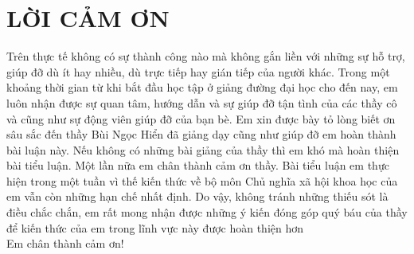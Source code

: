 \section*{LỜI CẢM ƠN}
\thispagestyle{empty}
Trên thực tế không có sự thành công nào mà không gắn liền với những sự hỗ trợ, giúp đỡ dù ít hay nhiều, dù trực tiếp hay gián tiếp của người khác. Trong một khoảng thời gian từ khi bắt đầu học tập ở giảng đường đại học cho đến nay, em luôn nhận được sự quan tâm, hướng dẫn và sự giúp đỡ tận tình của các thầy cô và cũng như sự động viên giúp đỡ của bạn bè. Em xin được bày tỏ lòng biết ơn sâu sắc đến thầy Bùi Ngọc Hiển đã giảng dạy cũng như giúp đỡ em hoàn thành bài luận này. Nếu không có những bài giảng của thầy thì em khó mà hoàn thiện bài tiểu luận. Một lần nữa em chân thành cảm ơn thầy. Bài tiểu luận em thực hiện trong một tuần vì thế kiến thức về bộ môn Chủ nghĩa xã hội khoa học của em vẫn còn những hạn chế nhất định. Do vậy, không tránh những thiếu sót là điều chắc chắn, em rất mong nhận được những ý kiến đóng góp quý báu của thầy để kiến thức của em trong lĩnh vực này được hoàn thiện hơn\\
Em chân thành cảm ơn!
\clearpage